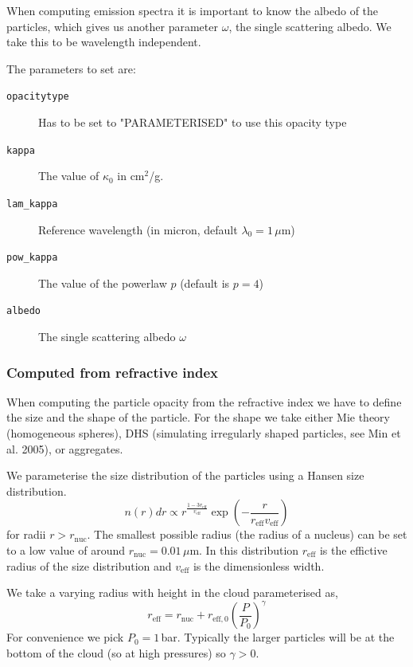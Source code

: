\documentclass[12pt]{article}
\begin{document}
When computing emission spectra it is important to know the albedo of the particles, which gives us another parameter $\omega$, the single scattering albedo. We take this to be wavelength independent.

The parameters to set are:
\begin{description}
\item[\texttt{opacitytype}]
Has to be set to "PARAMETERISED" to use this opacity type
\item[\texttt{kappa}]
The value of $\kappa_0$ in cm$^2$/g.
\item[\texttt{lam\_kappa}]
Reference wavelength (in micron, default $\lambda_0=1\,\mu$m)
\item[\texttt{pow\_kappa}]
The value of the powerlaw $p$ (default is $p=4$)
\item[\texttt{albedo}]
The single scattering albedo $\omega$
\end{description}

\subsubsection{Computed from refractive index}

When computing the particle opacity from the refractive index we have to define the size and the shape of the particle. For the shape we take either Mie theory (homogeneous spheres), DHS (simulating irregularly shaped particles, see Min et al. 2005), or aggregates.

We parameterise the size distribution of the particles using a Hansen size distribution.
\begin{equation}
n(r)dr\propto r^\frac{1-3v_\mathrm{eff}}{v_\mathrm{eff}} \exp\left(-\frac{r}{r_\mathrm{eff}v_\mathrm{eff}}\right)
\end{equation}
for radii $r > r_\mathrm{nuc}$. The smallest possible radius (the radius of a nucleus) can be set to a low value of around $r_\mathrm{nuc}=0.01\,\mu$m. In this distribution $r_\mathrm{eff}$ is the effictive radius of the size distribution and $v_\mathrm{eff}$ is the dimensionless width.

We take a varying radius with height in the cloud parameterised as,
\begin{equation}
r_\mathrm{eff}=r_\mathrm{nuc}+r_\mathrm{eff,0}\left(\frac{P}{P_0}\right)^\gamma
\end{equation}
For convenience we pick $P_0=1\,$bar. Typically the larger particles will be at the bottom of the cloud (so at high pressures) so $\gamma>0$.
\end{document}
